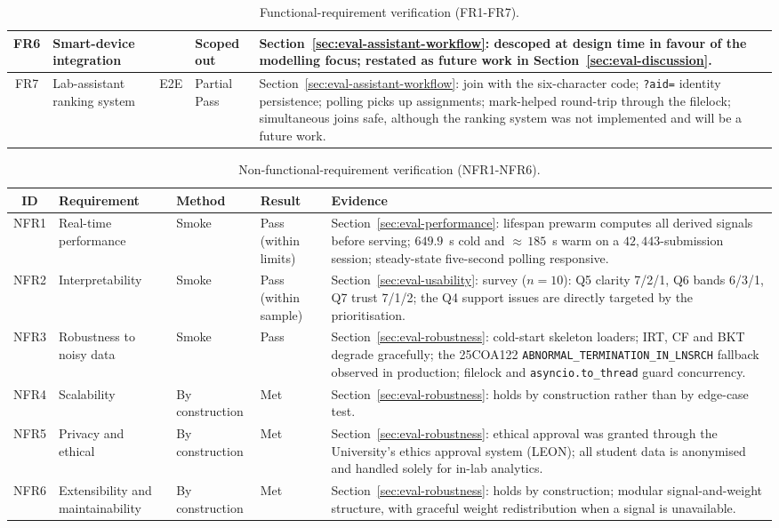 \begin{table}[H]
\begin{tabularx}{\textwidth}{|c|p{}|c|p{}|X|}
\hline
FR6 & Smart-device integration & & Scoped out & Section~\ref{sec:eval-assistant-workflow}: descoped at design time in favour of the modelling focus; restated as future work in Section~\ref{sec:eval-discussion}. \\
\hline
FR7 & Lab-assistant ranking system & E2E & Partial Pass & Section~\ref{sec:eval-assistant-workflow}: join with the six-character code; \texttt{?aid=} identity persistence; polling picks up assignments; mark-helped round-trip through the filelock; simultaneous joins safe, although the ranking system was not implemented and will be a future work. \\
\hline
\end{tabularx}
\caption{Functional-requirement verification (FR1-FR7).}
\label{tab:fr-verification}
\end{table}

\begin{table}[H]
\centering
\small
\renewcommand{\arraystretch}{1.3}
\begin{tabularx}{\textwidth}{|c|p{}|p{}|p{}|X|}
\hline
\textbf{ID} & \textbf{Requirement} & \textbf{Method} & \textbf{Result} & \textbf{Evidence} \\
\hline\hline
NFR1 & Real-time performance & Smoke & Pass (within limits) & Section~\ref{sec:eval-performance}: lifespan prewarm computes all derived signals before serving; $649.9$~s cold and ${\approx}\,185$~s warm on a $42{,}443$-submission session; steady-state five-second polling responsive. \\
\hline
NFR2 & Interpretability & Smoke & Pass (within sample) & Section~\ref{sec:eval-usability}: survey ($n{=}10$): Q5 clarity 7/2/1, Q6 bands 6/3/1, Q7 trust 7/1/2; the Q4 support issues are directly targeted by the prioritisation. \\
\hline
NFR3 & Robustness to noisy data & Smoke & Pass & Section~\ref{sec:eval-robustness}: cold-start skeleton loaders; IRT, CF and BKT degrade gracefully; the 25COA122 \texttt{ABNORMAL\_TERMINATION\_IN\_LNSRCH} fallback observed in production; filelock and \texttt{asyncio.to\_thread} guard concurrency. \\
\hline
NFR4 & Scalability & By construction & Met & Section~\ref{sec:eval-robustness}: holds by construction rather than by edge-case test. \\
\hline
NFR5 & Privacy and ethical & By construction & Met & Section~\ref{sec:eval-robustness}: ethical approval was granted through the University's ethics approval system (LEON); all student data is anonymised and handled solely for in-lab analytics. \\
\hline
NFR6 & Extensibility and maintainability & By construction & Met & Section~\ref{sec:eval-robustness}: holds by construction; modular signal-and-weight structure, with graceful weight redistribution when a signal is unavailable. \\
\hline
\end{tabularx}
\caption{Non-functional-requirement verification (NFR1-NFR6).}
\label{tab:nfr-verification}
\end{table}
